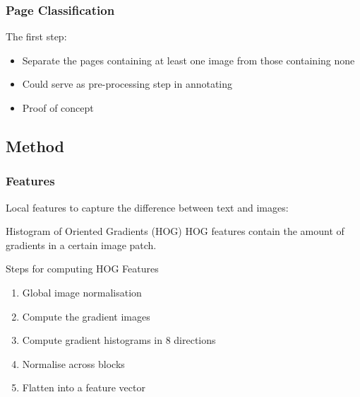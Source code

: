 %
\begin{frame}
\frametitle{Page Classification}
The first step:
\begin{itemize}
\item Separate the pages containing at least one image from those
containing none
\item Could serve as pre-processing step in annotating
\item Proof of concept
\end{itemize}
\end{frame}



\subsection{Method}

\begin{frame}
\frametitle{Features}
Local features to capture the difference between text and images:
	\begin{block}{Histogram of Oriented Gradients (HOG)}
		HOG features contain the amount of gradients in a certain image patch.
	\end{block}
	\begin{block}{Steps for computing HOG Features\cite{dalal2005histograms}}
	\begin{enumerate}
		\item Global image normalisation
		\item Compute the gradient images
		\item Compute gradient histograms in 8 directions
		\item Normalise across blocks
		\item Flatten into a feature vector
	\end{enumerate}
	\end{block}
\end{frame}

